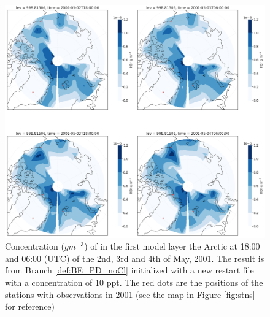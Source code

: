 \begin{figure}[h]
    \centering
    \includegraphics[width=\linewidth]{Chapter6_Results/images/polarHBr_newRestart.png}
    \caption{Concentration ($g m^{-3}$) of  in the first model layer the Arctic at 18:00 and 06:00 (UTC) of the 2nd, 3rd and 4th of May, 2001. The result is from Branch \ref{def:BE_PD_noCl} initialized with a new restart file with a  concentration of 10 ppt. The red dots are the positions of the stations with observations in 2001 (see the map in Figure \ref{fig:stns} for reference)}
    \label{fig:polarHBr_newRestart}
\end{figure}